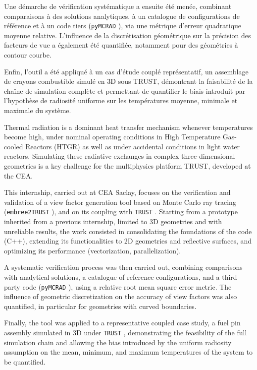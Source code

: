 \documentclass[a4paper, 11pt, english]{report}
\newcommand{\ETT}{\texttt{embree2TRUST} }
\newcommand{\trust}{\texttt{TRUST} }
\newcommand{\pcr}{\texttt{pyMCRAD} }
\begin{document}
Une démarche de vérification systématique a ensuite été menée, combinant comparaisons à des solutions analytiques, à un catalogue de configurations de référence et à un code tiers (\pcr), via une métrique d'erreur quadratique moyenne relative. L'influence de la discrétisation géométrique sur la précision des facteurs de vue a également été quantifiée, notamment pour des géométries à contour courbe.

Enfin, l'outil a été appliqué à un cas d'étude couplé représentatif, un assemblage de crayons combustible simulé en 3D sous TRUST, démontrant la faisabilité de la chaîne de simulation complète et permettant de quantifier le biais introduit par l'hypothèse de radiosité uniforme sur les températures moyenne, minimale et maximale du système.

\vspace{6pt}
\vspace{-13pt}
Thermal radiation is a dominant heat transfer mechanism whenever temperatures become high, under nominal operating conditions in High Temperature Gas-cooled Reactors (HTGR) as well as under accidental conditions in light water reactors. Simulating these radiative exchanges in complex three-dimensional geometries is a key challenge for the multiphysics platform TRUST, developed at the CEA.

This internship, carried out at CEA Saclay, focuses on the verification and validation of a view factor generation tool based on Monte Carlo ray tracing (\ETT), and on its coupling with \trust. Starting from a prototype inherited from a previous internship, limited to 3D geometries and with unreliable results, the work consisted in consolidating the foundations of the code (C++), extending its functionalities to 2D geometries and reflective surfaces, and optimizing its performance (vectorization, parallelization).

A systematic verification process was then carried out, combining comparisons with analytical solutions, a catalogue of reference configurations, and a third-party code (\pcr), using a relative root mean square error metric. The influence of geometric discretization on the accuracy of view factors was also quantified, in particular for geometries with curved boundaries.

Finally, the tool was applied to a representative coupled case study, a fuel pin assembly simulated in 3D under \trust, demonstrating the feasibility of the full simulation chain and allowing the bias introduced by the uniform radiosity assumption on the mean, minimum, and maximum temperatures of the system to be quantified.
\end{document}
